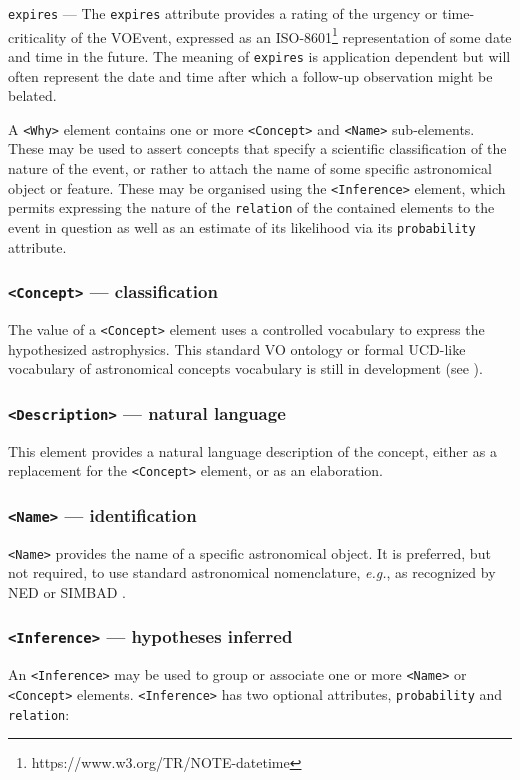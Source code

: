 \documentclass[11pt,a4paper]{ivoa}
\begin{document}
 {\tt expires}\label{sec:3.6.2} --- 
The {\tt expires} attribute provides a rating of the urgency or time-criticality of the VOEvent, expressed as an ISO-8601\footnote{https://www.w3.org/TR/NOTE-datetime} representation of some date and time in the future. The meaning of {\tt expires} is application dependent but will often represent the date and time after which a follow-up observation might be belated. 

A {\tt <Why>} element contains one or more {\tt <Concept>} and {\tt <Name>} sub-elements. These may be used to assert concepts that specify a scientific classification of the nature of the event, or rather to attach the name of some specific astronomical object or feature. These may be organised using the {\tt <Inference>} element, which permits expressing the nature of the {\tt relation} of the contained elements to the event in question as well as an estimate of its likelihood via its {\tt probability} attribute. 

\setcounter{subsubsection}{2} 
\subsubsection{{\tt <Concept>} --- classification}\label{sec:3.6.3}
The value of a {\tt <Concept>} element uses a controlled vocabulary to express the hypothesized astrophysics. This standard VO ontology or formal UCD-like vocabulary of astronomical concepts vocabulary is still in development (see \citep{2018ivoa.spec.0527M}).

\subsubsection{{\tt <Description>} --- natural language}\label{sec:3.6.4}
This element provides a natural language description of the concept, either as a replacement for the {\tt <Concept>} element, or as an elaboration. 

\subsubsection{{\tt <Name>} --- identification}\label{sec:3.6.5}
{\tt <Name>} provides the name of a specific astronomical object. It is preferred, but not required, to use standard astronomical nomenclature, \emph{e.g.}, as recognized by NED \citep{bib22} or SIMBAD \citep{bib23}. 

\subsubsection{{\tt <Inference>} --- hypotheses inferred}\label{sec:3.6.6}
An {\tt <Inference>} may be used to group or associate one or more {\tt <Name>} or {\tt <Concept>} elements. {\tt <Inference>} has two optional attributes, {\tt probability} and {\tt relation}: 
\end{document}
